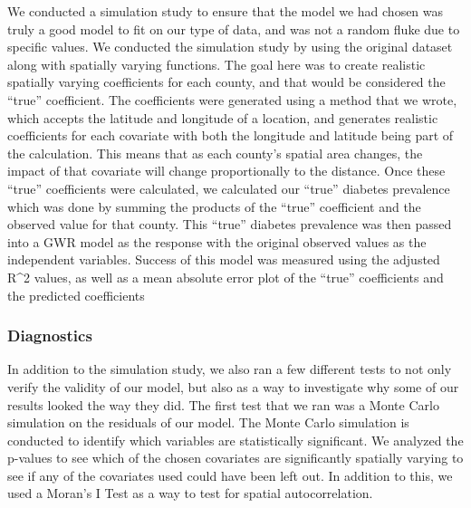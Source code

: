 \documentclass[
]{article}
\begin{document}
We conducted a simulation study to ensure that the model we had chosen
was truly a good model to fit on our type of data, and was not a random
fluke due to specific values. We conducted the simulation study by using
the original dataset along with spatially varying functions. The goal
here was to create realistic spatially varying coefficients for each
county, and that would be considered the ``true'' coefficient. The
coefficients were generated using a method that we wrote, which accepts
the latitude and longitude of a location, and generates realistic
coefficients for each covariate with both the longitude and latitude
being part of the calculation. This means that as each county's spatial
area changes, the impact of that covariate will change proportionally to
the distance. Once these ``true'' coefficients were calculated, we
calculated our ``true'' diabetes prevalence which was done by summing
the products of the ``true'' coefficient and the observed value for that
county. This ``true'' diabetes prevalence was then passed into a GWR
model as the response with the original observed values as the
independent variables. Success of this model was measured using the
adjusted R\^{}2 values, as well as a mean absolute error plot of the
``true'' coefficients and the predicted coefficients

\subsubsection{Diagnostics}\label{diagnostics}

In addition to the simulation study, we also ran a few different tests
to not only verify the validity of our model, but also as a way to
investigate why some of our results looked the way they did. The first
test that we ran was a Monte Carlo simulation on the residuals of our
model. The Monte Carlo simulation is conducted to identify which
variables are statistically significant. We analyzed the p-values to see
which of the chosen covariates are significantly spatially varying to
see if any of the covariates used could have been left out. In addition
to this, we used a Moran's I Test as a way to test for spatial
autocorrelation.
\end{document}
